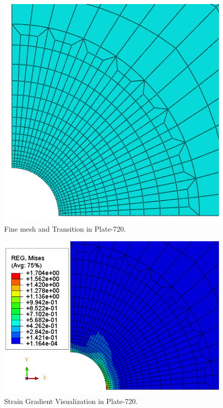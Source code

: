 \documentclass[12pt]{article}
\begin{document}
\begin{figure}[H]
	\begin{center}
		\includegraphics[scale=0.38]{fine_mesh_part.png} 
	\end{center} 
   \caption{Fine mesh and Transition in Plate-720.} 
\end{figure}
\begin{figure}[H]
	\begin{center}
		\includegraphics[scale=0.8]{full_grad_crop.png} 
	\end{center}  
   \caption{Strain Gradient Visualization in Plate-720.}
\end{figure}
\end{document}
